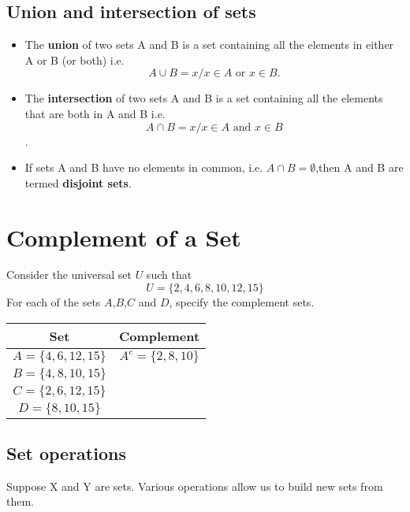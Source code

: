 \documentclass[11pt,a4paper,titlepage,oneside,openany]{article}
\numberwithin{equation}{section}
\numberwithin{algorithm}{section}
\numberwithin{figure}{section}
\numberwithin{table}{section}
\begin{document}
\subsection*{Union and intersection of sets}

\begin{itemize}
\item The \textbf{union} of two sets A and B is a set containing all the elements in
either A or B (or both)
i.e.
\[A \cup B = {x / x \in A \mbox{ or } x \in B}.\]
\item The \textbf{intersection} of two sets A and B is a set containing all the elements
that are both in A and B
i.e.
\[A \cap B = {x / x \in A \mbox{ and }x \in B}\].

\item If sets A and B have no elements in common, i.e. $A \cap B = \emptyset$,then A and B
are termed \textbf{disjoint sets}.
\end{itemize}


\section*{Complement of a Set}
Consider the universal set $U$ such that
\[U=\{2,4,6,8,10,12,15\} \]
For each of the sets $A$,$B$,$C$ and $D$, specify the complement sets.
\begin{center}
\begin{tabular}{|c|c|}
\hline
Set & Complement\\
\hline $A=\{4,6,12,15\}$ &
$A^{c}=\{2,8,10\}$ \\ \hline $B=\{4,8,10,15\}$ & \\ \hline
$C=\{2,6,12,15\}$ & \\ \hline $D=\{8,10,15\}$ & \\ \hline

\end{tabular}
\end{center}

\subsection{Set operations}

Suppose X and Y are sets. Various operations allow us to build new sets from them.
\end{document}
